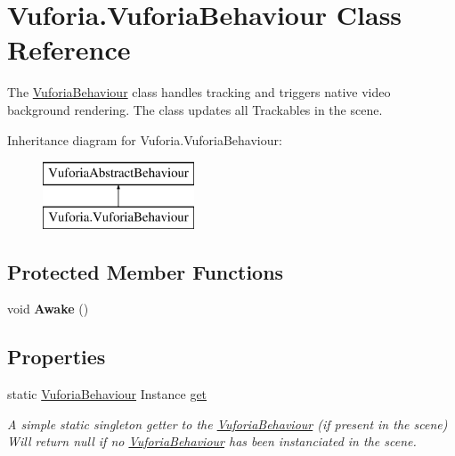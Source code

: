 \hypertarget{class_vuforia_1_1_vuforia_behaviour}{}\section{Vuforia.\+Vuforia\+Behaviour Class Reference}
\label{class_vuforia_1_1_vuforia_behaviour}


The \hyperlink{class_vuforia_1_1_vuforia_behaviour}{Vuforia\+Behaviour} class handles tracking and triggers native video background rendering. The class updates all Trackables in the scene.  


Inheritance diagram for Vuforia.\+Vuforia\+Behaviour\+:\begin{figure}[H]
\begin{center}
\leavevmode
\includegraphics[height=2.000000cm]{class_vuforia_1_1_vuforia_behaviour}
\end{center}
\end{figure}
\subsection*{Protected Member Functions}
\begin{DoxyCompactItemize}
\item 
\hypertarget{class_vuforia_1_1_vuforia_behaviour_a3beb57ed3d30146f27f3b98552b66020}{}void {\bfseries Awake} ()\label{class_vuforia_1_1_vuforia_behaviour_a3beb57ed3d30146f27f3b98552b66020}

\end{DoxyCompactItemize}
\subsection*{Properties}
\begin{DoxyCompactItemize}
\item 
static \hyperlink{class_vuforia_1_1_vuforia_behaviour}{Vuforia\+Behaviour} Instance \hyperlink{class_vuforia_1_1_vuforia_behaviour_ab45dcaa07abe911c78048f8c3a8badc5_ab45dcaa07abe911c78048f8c3a8badc5}{get}
\begin{DoxyCompactList}\small\item\em A simple static singleton getter to the \hyperlink{class_vuforia_1_1_vuforia_behaviour}{Vuforia\+Behaviour} (if present in the scene) Will return null if no \hyperlink{class_vuforia_1_1_vuforia_behaviour}{Vuforia\+Behaviour} has been instanciated in the scene. \end{DoxyCompactList}\end{DoxyCompactItemize}


